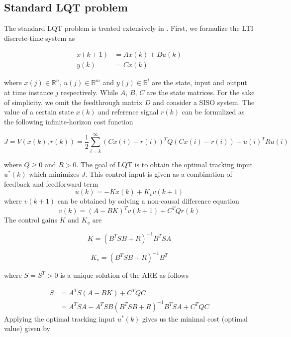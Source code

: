\subsection{Standard LQT problem}
The standard \ac {LQT} problem is treated extensively in \cite{lewis1995optimal}. First, we formulize the \ac {LTI} discrete-time system as 

\begin{equation} \label{eq:ss}
\begin{split}
x(k+1) &= Ax(k) + Bu(k) \\
y(k) &= Cx(k)
\end{split}
\end{equation}

where $x(j) \in \mathbb{R}^n$, $u(j) \in \mathbb{R}^m$ and $y(j) \in \mathbb{R}^l$ are the state, input and output at time instance $j$ respectively. While $A$, $B$, $C$ are the state matrices. For the sake of simplicity, we omit the feedthrough matrix $D$ and consider a \ac {SISO} system. The value of a certain state $x(k)$ and reference signal $r(k)$ can be formulized as the following infinite-horizon cost function

\begin{equation}
\label{eq:infcost}
J = V(x(k), r(k)) = \frac{1}{2} \sum_{i=k}^{\infty} (Cx(i)-r(i))^TQ(Cx(i)-r(i)) + u(i)^TRu(i)
\end{equation}

where $Q \geq 0$ and $R > 0$. The goal of LQT is to obtain the optimal tracking input $u^*(k)$ which minimizes $J$. This control input is given as a combination of feedback and feedforward term
\begin{equation}
u(k) = -Kx(k) + K_vv(k+1)
\end{equation}
where $v(k+1)$ can be obtained by solving a non-causal difference equation
\begin{equation}
v(k) = (A-BK)^Tv(k+1) + C^TQr(k)
\label{eq:noncausal}
\end{equation}
The control gains $K$ and $K_v$ are

\begin{equation}
K = (B^TSB + R)^{-1}B^TSA
\end{equation}

\begin{equation}
K_v = (B^TSB + R)^{-1}B^T
\end{equation}

where $S=S^T>0$ is a unique solution of the \ac {ARE} as follows

\begin{equation}
\begin{split}
S &= A^TS(A-BK) + C^TQC \\
&= A^TSA - A^TSB(B^TSB+R)^{-1}B^TSA + C^TQC
\end{split}
\end{equation}
Applying the optimal tracking input $u^*(k)$ gives us the minimal cost (optimal value) given by

